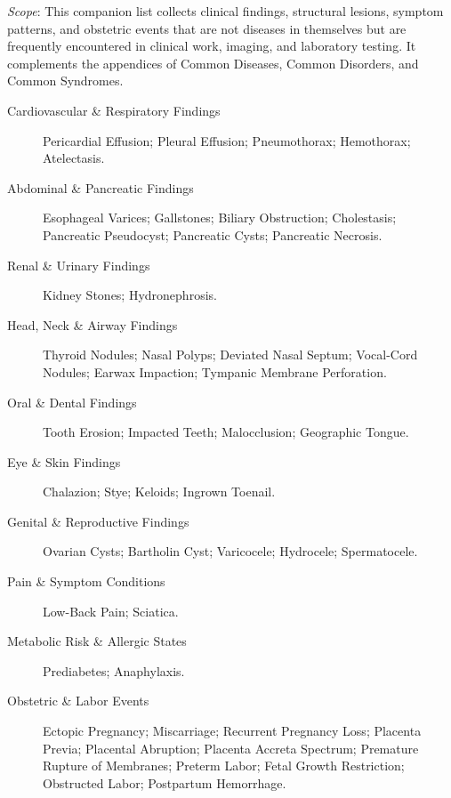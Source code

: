 \small
\noindent\textit{Scope}: This companion list collects clinical findings, structural lesions, symptom patterns, and obstetric events that are not diseases in themselves but are frequently encountered in clinical work, imaging, and laboratory testing. It complements the appendices of Common Diseases, Common Disorders, and Common Syndromes.

\medskip
\begin{description}
\item[Cardiovascular \& Respiratory Findings] Pericardial Effusion; Pleural Effusion; Pneumothorax; Hemothorax; Atelectasis.

\item[Abdominal \& Pancreatic Findings] Esophageal Varices; Gallstones; Biliary Obstruction; Cholestasis; Pancreatic Pseudocyst; Pancreatic Cysts; Pancreatic Necrosis.

\item[Renal \& Urinary Findings] Kidney Stones; Hydronephrosis.

\item[Head, Neck \& Airway Findings] Thyroid Nodules; Nasal Polyps; Deviated Nasal Septum; Vocal-Cord Nodules; Earwax Impaction; Tympanic Membrane Perforation.

\item[Oral \& Dental Findings] Tooth Erosion; Impacted Teeth; Malocclusion; Geographic Tongue.

\item[Eye \& Skin Findings] Chalazion; Stye; Keloids; Ingrown Toenail.

\item[Genital \& Reproductive Findings] Ovarian Cysts; Bartholin Cyst; Varicocele; Hydrocele; Spermatocele.

\item[Pain \& Symptom Conditions] Low-Back Pain; Sciatica.

\item[Metabolic Risk \& Allergic States] Prediabetes; Anaphylaxis.

\item[Obstetric \& Labor Events] Ectopic Pregnancy; Miscarriage; Recurrent Pregnancy Loss; Placenta Previa; Placental Abruption; Placenta Accreta Spectrum; Premature Rupture of Membranes; Preterm Labor; Fetal Growth Restriction; Obstructed Labor; Postpartum Hemorrhage.
\end{description}